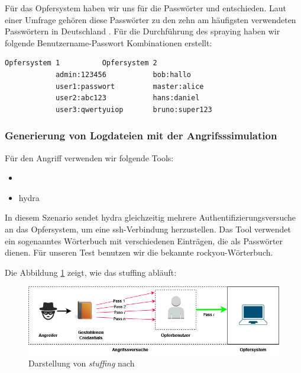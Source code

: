 Für das Opfersystem haben wir uns für die Passwörter  und  entschieden. Laut einer Umfrage gehören diese Passwörter zu den zehn am häufigsten verwendeten Passwörtern in Deutschland \citep{silicon_passwort}. Für die Durchführung des \gls{spraying} haben wir folgende Benutzername-Passwort Kombinationen erstellt:

{
\begin{lstlisting}[frame=single]
            Opfersystem 1          Opfersystem 2
            admin:123456           bob:hallo
            user1:passwort         master:alice
            user2:abc123           hans:daniel
            user3:qwertyuiop       bruno:super123
\end{lstlisting}
}

\newpage
\subsubsection{Generierung von Logdateien mit der Angrifsssimulation}
Für den Angriff verwenden wir folgende Tools:

{
\begin{itemize}[noitemsep]
   \item	{}
   \item \gls{hydra}
\end{itemize}
}

In diesem Szenario sendet \gls{hydra} gleichzeitig mehrere Authentifizierungsversuche an das Opfersystem, um eine \gls{ssh}-Verbindung herzustellen. Das Tool verwendet ein sogenanntes Wörterbuch mit verschiedenen Einträgen, die als Passwörter dienen. Für unseren Test benutzen wir die bekannte \gls{rockyou}-Wörterbuch.

Die Abbildung \ref{fig:stuffing} zeigt, wie das \gls{stuffing} abläuft:
\begin{figure}[H]
   \centering
   \includegraphics[width=1\textwidth]{assets/Stuffing.png}
   \caption[Darstellung von \textit{\gls{stuffing}}]
   {Darstellung von \textit{\gls{stuffing}} nach \cite{Nguyen_stuffing}}
   \label{fig:stuffing}
   \centering
\end{figure}

